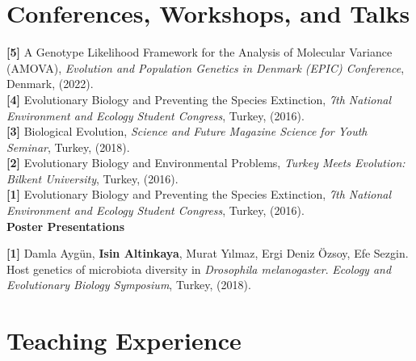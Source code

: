 \documentclass[letterpaper,10.5pt]{article}
\begin{document}
\section{Conferences, Workshops, and Talks}
\textbf{[5]} \hspace{0.42cm} {A Genotype Likelihood Framework for the Analysis of Molecular Variance (AMOVA)}, \textit{Evolution and Population Genetics in Denmark (EPIC) Conference}, Denmark, (2022). \\
\smallskip
\textbf{[4]} \hspace{0.42cm} {Evolutionary Biology and Preventing the Species Extinction}, \textit{7th National Environment and Ecology Student Congress}, Turkey, (2016). \\
\smallskip
\textbf{[3]} \hspace{0.42cm} {Biological Evolution}, \textit{Science and Future Magazine Science for Youth Seminar}, Turkey, (2018). \\
\smallskip
\textbf{[2]} \hspace{0.42cm} {Evolutionary Biology and Environmental Problems}, \textit{Turkey Meets Evolution: Bilkent University}, Turkey, (2016). \\
\smallskip
\textbf{[1]} \hspace{0.42cm} {Evolutionary Biology and Preventing the Species Extinction}, \textit{7th National Environment and Ecology Student Congress}, Turkey, (2016). \\

\medskip
\textbf{Poster Presentations}
\medskip

\textbf{[1]} \hspace{0.42cm} Damla Aygün, \textbf{Isin Altinkaya}, Murat Y{\i}lmaz, Ergi Deniz \"{O}zsoy, Efe Sezgin. Host genetics of microbiota diversity in \textit{Drosophila melanogaster}. \textit{Ecology and Evolutionary Biology Symposium}, Turkey, (2018). \\



\section{Teaching Experience}
\end{document}
